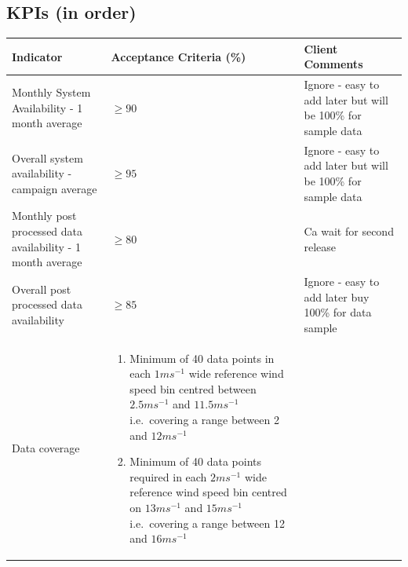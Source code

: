 \documentclass{article}
\begin{document}
\begin{multicols}{2}
    \subsection{KPIs (in order)}
    \begin{tabularx}{\linewidth}{XXX}
        Indicator & Acceptance Criteria (\%) & Client Comments \\
        \toprule
        Monthly System Availability - 1 month average & $\geq 90$ & Ignore - easy to add later but will be 100\% for sample data \\
        Overall system availability - campaign average & $\geq 95$ & Ignore - easy to add later but will be 100\% for sample data \\
        Monthly post processed data availability - 1 month average & $\geq 80$ & Ca wait for second release \\
        Overall post processed data availability & $ \geq 85$ & Ignore - easy to add later buy 100\% for data sample \\
        Data coverage & 
        \begin{enumerate}
            \item Minimum of 40 data points in each $1ms^{-1}$ wide reference wind speed bin centred between $2.5ms^{-1}$ and $11.5ms^{-1}$ i.e.\ covering a range between 2 and $12ms^{-1}$
            \item Minimum of 40 data points required in each $2ms^{-1}$ wide reference wind speed bin centred on $13ms^{-1}$ and $15ms^{-1}$ i.e.\ covering a range between 12 and $16ms^{-1}$
        \end{enumerate}
    \end{tabularx}
    \vfill\null\columnbreak{}
    \vfill\null{}
\end{multicols}
\end{document}
